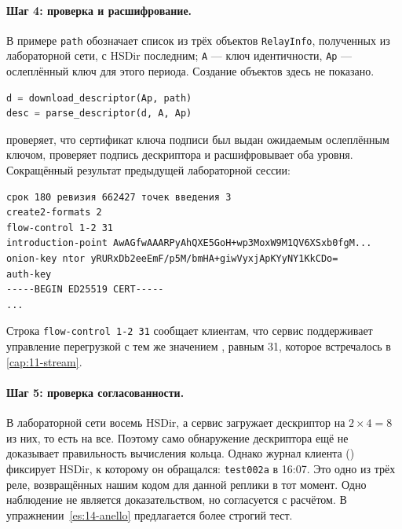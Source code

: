 \paragraph{Шаг 4: проверка и расшифрование.} В примере \texttt{path} обозначает список из трёх объектов \texttt{RelayInfo}, полученных из лабораторной сети, с HSDir последним; \texttt{A} --- ключ идентичности, \texttt{Ap} --- ослеплённый ключ для этого периода. Создание объектов здесь не показано.
\begin{lstlisting}[language=Python]
d = download_descriptor(Ap, path)
desc = parse_descriptor(d, A, Ap)
\end{lstlisting}
 проверяет, что сертификат ключа подписи был выдан ожидаемым ослеплённым ключом, проверяет подпись дескриптора и расшифровывает оба уровня. Сокращённый результат предыдущей лабораторной сессии:
\begin{lstlisting}[numbers=none]
срок 180 ревизия 662427 точек введения 3
create2-formats 2
flow-control 1-2 31
introduction-point AwAGfwAAARPyAhQXE5GoH+wp3MoxW9M1QV6XSxb0fgM...
onion-key ntor yRURxDb2eeEmF/p5M/bmHA+giwVyxjApKYyNY1KkCDo=
auth-key
-----BEGIN ED25519 CERT-----
...
\end{lstlisting}
Строка \texttt{flow-control 1-2 31} сообщает клиентам, что сервис поддерживает управление перегрузкой с тем же значением , равным 31, которое встречалось в \cref{cap:11-stream}.

\paragraph{Шаг 5: проверка согласованности.} В лабораторной сети восемь HSDir, а сервис загружает дескриптор на $2 \times 4 = 8$ из них, то есть на все. Поэтому само обнаружение дескриптора ещё не доказывает правильность вычисления кольца. Однако журнал клиента () фиксирует HSDir, к которому он обращался: \texttt{test002a} в 16:07. Это одно из трёх реле, возвращённых нашим кодом для данной реплики в тот момент. Одно наблюдение не является доказательством, но согласуется с расчётом. В упражнении~\ref{es:14-anello} предлагается более строгий тест.

